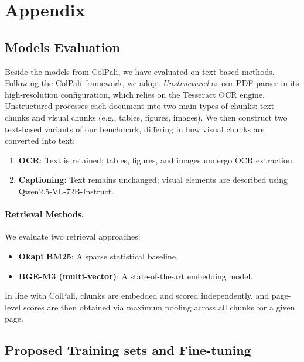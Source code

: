 \clearpage
\section{Appendix}
\label{sec:appendix}

\renewcommand{\thefigure}{S\arabic{figure}} %
\renewcommand{\thetable}{S\arabic{table}}   %
\setcounter{figure}{0}  %
\setcounter{table}{0}

\subsection{Models Evaluation} \label{sec:appendix_model_evalaution}
Beside the models from ColPali, we have evaluated on text based methods.
Following the ColPali framework, we adopt \emph{Unstructured} as our PDF parser in its high-resolution configuration, which relies on the Tesseract \cite{smith2007overview} OCR engine.
Unstructured processes each document into two main types of chunks: text chunks and visual chunks (e.g., tables, figures, images).
We then construct two text-based variants of our benchmark, differing in how visual chunks are converted into text:
\begin{enumerate}[leftmargin=*]
    \item \textbf{OCR}: Text is retained; tables, figures, and images undergo OCR extraction.
    \item \textbf{Captioning}: Text remains unchanged; visual elements are described using Qwen2.5-VL-72B-Instruct.
\end{enumerate}

\paragraph{Retrieval Methods.} 

We evaluate two retrieval approaches:  
\begin{itemize}[leftmargin=*]
    \item \textbf{Okapi BM25}: A sparse statistical baseline.
    \item \textbf{BGE-M3 (multi-vector)}: A state-of-the-art embedding model.
\end{itemize}


In line with ColPali, chunks are embedded and scored independently, and page-level scores are then obtained via maximum pooling across all chunks for a given page.

\subsection{Proposed Training sets and Fine-tuning} \label{sec:training_Sets_and_finetune_detailes}

